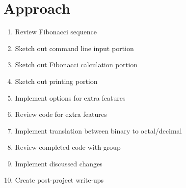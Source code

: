 \documentclass{article}
\begin{document}
\section*{Approach}
\begin{enumerate}
	\item Review Fibonacci sequence 
	\item Sketch out command line input portion
	\item Sketch out Fibonacci calculation portion
        \item Sketch out printing portion 
        \item Implement options for extra features 
        \item Review code for extra features
        \item Implement translation between binary to octal/decimal
	\item Review completed code with group
	\item Implement discussed changes
	\item Create post-project write-ups
\end{enumerate}
\end{document}
